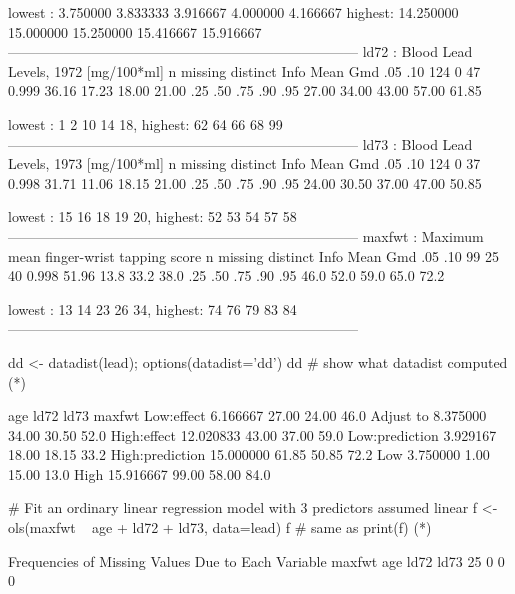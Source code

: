 \begin{Schunk}
\begin{Soutput}
lowest :  3.750000  3.833333  3.916667  4.000000  4.166667
highest: 14.250000 15.000000 15.250000 15.416667 15.916667
---------------------------------------------------------------------------
ld72 : Blood Lead Levels, 1972 [mg/100*ml] 
       n  missing distinct     Info     Mean      Gmd      .05      .10 
     124        0       47    0.999    36.16    17.23    18.00    21.00 
     .25      .50      .75      .90      .95 
   27.00    34.00    43.00    57.00    61.85 

lowest :  1  2 10 14 18, highest: 62 64 66 68 99
---------------------------------------------------------------------------
ld73 : Blood Lead Levels, 1973 [mg/100*ml] 
       n  missing distinct     Info     Mean      Gmd      .05      .10 
     124        0       37    0.998    31.71    11.06    18.15    21.00 
     .25      .50      .75      .90      .95 
   24.00    30.50    37.00    47.00    50.85 

lowest : 15 16 18 19 20, highest: 52 53 54 57 58
---------------------------------------------------------------------------
maxfwt : Maximum mean finger-wrist tapping score 
       n  missing distinct     Info     Mean      Gmd      .05      .10 
      99       25       40    0.998    51.96     13.8     33.2     38.0 
     .25      .50      .75      .90      .95 
    46.0     52.0     59.0     65.0     72.2 

lowest : 13 14 23 26 34, highest: 74 76 79 83 84
---------------------------------------------------------------------------
\end{Soutput}
\begin{Sinput}
dd <- datadist(lead); options(datadist='dd')
dd    # show what datadist computed (*\ipacue*)
\end{Sinput}
\begin{Soutput}
                      age  ld72  ld73 maxfwt
Low:effect       6.166667 27.00 24.00   46.0
Adjust to        8.375000 34.00 30.50   52.0
High:effect     12.020833 43.00 37.00   59.0
Low:prediction   3.929167 18.00 18.15   33.2
High:prediction 15.000000 61.85 50.85   72.2
Low              3.750000  1.00 15.00   13.0
High            15.916667 99.00 58.00   84.0
\end{Soutput}
\begin{Sinput}
# Fit an ordinary linear regression model with 3 predictors assumed linear
f <- ols(maxfwt ~ age + ld72 + ld73, data=lead)
f         # same as print(f)  (*\ipacue*)
\end{Sinput}
\begin{Soutput}
Frequencies of Missing Values Due to Each Variable
maxfwt    age   ld72   ld73 
    25      0      0      0 


\end{Soutput}
\end{Schunk}
